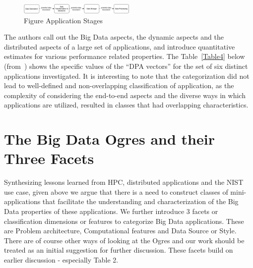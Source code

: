\documentclass{acm_proc_article-sp}
\begin{document}
\begin{figure}
\centering
\includegraphics[width=0.5\textwidth]{fig1.pdf}
\caption{Figure Application Stages}
\label{figure1}
\end{figure}

The authors call out the Big Data aspects, the dynamic aspects and the
distributed aspects of a large set of applications, and introduce quantitative
estimates for various performance related properties. The Table~\ref{Table4}
below (from~\cite{b26}) shows the specific values of the ``DPA vectors'' for
the set of six distinct applications investigated. It is interesting to note
that the categorization did not lead to well-defined and non-overlapping
classification of application, as the complexity of considering the end-to-end
aspects and the diverse ways in which applications are utilized, resulted in
classes that had overlapping characteristics.



\section{The Big Data Ogres and their Three Facets}


Synthesizing lessons learned from HPC, distributed applications and the NIST use case, given above we argue that there is a need to construct classes of mini-applications that facilitate the understanding and characterization of the Big Data properties of these applications. We further introduce 3 facets or classification dimensions or features to categorize Big Data applications. These are Problem architecture, Computational features and Data Source or Style. There are of course other ways of looking at the Ogres and our work should be treated as an initial suggestion for further discussion. These facets build on earlier discussion - especially Table 2.
\end{document}
